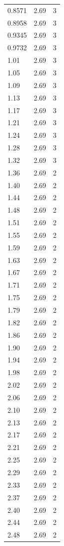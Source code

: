 \begin{longtable}{lrr}
  0.8571 & 2.69 & 3 \\
  0.8958 & 2.69 & 3 \\
  0.9345 & 2.69 & 3 \\
  0.9732 & 2.69 & 3 \\
  1.01 & 2.69 & 3 \\
  1.05 & 2.69 & 3 \\
  1.09 & 2.69 & 3 \\
  1.13 & 2.69 & 3 \\
  1.17 & 2.69 & 3 \\
  1.21 & 2.69 & 3 \\
  1.24 & 2.69 & 3 \\
  1.28 & 2.69 & 3 \\
  1.32 & 2.69 & 3 \\
  1.36 & 2.69 & 2 \\
  1.40 & 2.69 & 2 \\
  1.44 & 2.69 & 2 \\
  1.48 & 2.69 & 2 \\
  1.51 & 2.69 & 2 \\
  1.55 & 2.69 & 2 \\
  1.59 & 2.69 & 2 \\
  1.63 & 2.69 & 2 \\
  1.67 & 2.69 & 2 \\
  1.71 & 2.69 & 2 \\
  1.75 & 2.69 & 2 \\
  1.79 & 2.69 & 2 \\
  1.82 & 2.69 & 2 \\
  1.86 & 2.69 & 2 \\
  1.90 & 2.69 & 2 \\
  1.94 & 2.69 & 2 \\
  1.98 & 2.69 & 2 \\
  2.02 & 2.69 & 2 \\
  2.06 & 2.69 & 2 \\
  2.10 & 2.69 & 2 \\
  2.13 & 2.69 & 2 \\
  2.17 & 2.69 & 2 \\
  2.21 & 2.69 & 2 \\
  2.25 & 2.69 & 2 \\
  2.29 & 2.69 & 2 \\
  2.33 & 2.69 & 2 \\
  2.37 & 2.69 & 2 \\
  2.40 & 2.69 & 2 \\
  2.44 & 2.69 & 2 \\
  2.48 & 2.69 & 2 \\

\end{longtable}

